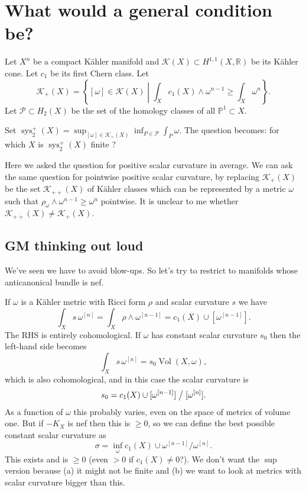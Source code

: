 \documentclass{amsart}
\numberwithin{equation}{section}
\theoremstyle{definition}
\DeclareMathOperator{\sys}{sys}
\DeclareMathOperator{\Vol}{Vol}
\begin{document}
\section{What would a general condition be?}

Let $X^n$ be a compact K\"ahler manifold and $\mathcal{K}(X)\subset H^{1,1}(X,\mathbb{R})$ be its K\"ahler cone. Let $c_1$ be its first Chern class. Let \[\mathcal{K}_+(X)=\left\{[\omega]\in\mathcal{K}(X)\middle|\int_X c_1(X)\wedge \omega^{n-1}\geq \int_X\omega^n\right\}.\]
Let $\mathcal{P}\subset H_2(X)$ be the set of the homology classes of  all $\mathbb{P}^1 \subset X$.

Set $\sys_2^+(X)=\sup_{[\omega]\in \mathcal{K}_+(X)}\inf_{P\in\mathcal{P}}\int_P\omega$. The question becomes: for which $X$ is $\sys_2^+(X)$ finite ?

Here we asked the question for positive scalar curvature in average. We can ask the same question for pointwise positive scalar curvature, by replacing $\mathcal{K}_+(X)$ be the set $\mathcal{K}_{++}(X)$ of K\"ahler classes which can be represented by a metric $\omega$ such that $\rho_\omega\wedge \omega^{n-1}\geq \omega^n$ pointwise. It is unclear to me whether $\mathcal{K}_{++}(X)\neq \mathcal{K}_{+}(X)$.

\subsection{GM thinking out loud}

We've seen we have to avoid blow-ups.
So let's try to restrict to manifolds whose anticanonical bundle is nef.

\def\^#1{^{[#1]}}
If $\omega$ is a K\"ahler metric with Ricci form $\rho$ and scalar curvature $s$ we have
$$
\int_X s \, \omega\^n
= \int_X \rho \wedge \omega\^{n-1}
= c_1(X) \cup [\omega\^{n-1}].
$$
The RHS is entirely cohomological.
If $\omega$ has constant scalar curvature $s_0$ then the left-hand side becomes
$$
\int_X s \, \omega\^n
= s_0 \Vol(X, \omega),
$$
which is also cohomological, and in this case the scalar curvature is
$$
s_0
= c_1(X) \cup [\omega\^{n-1}] \bigm/ [\omega\^n].
$$
As a function of $\omega$ this probably varies, even on the space of metrics of
volume one.
But if $-K_X$ is nef then this is $\geq 0$, so we can define the best possible
constant scalar curvature as
$$
\sigma = \inf_{\omega} c_1(X) \cup \omega\^{n-1} / \omega\^n.
$$
This exists and is $\geq 0$ (even $> 0$ if $c_1(X) \not= 0$?).
We don't want the $\sup$ version because (a) it might not be finite and (b) we want to look at metrics with scalar curvature bigger than this.
\end{document}
